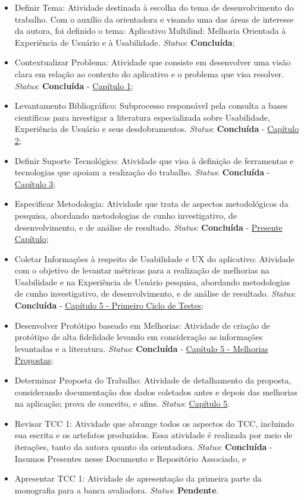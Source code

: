 \begin{itemize}
	\item Definir Tema: Atividade destinada à escolha do tema de desenvolvimento do trabalho. Com o auxílio da orientadora e visando uma das áreas de interesse da autora, foi definido o tema: Aplicativo Multilind: Melhoria Orientada à
	Experiência de Usuário e à Usabilidade. \textit{Status}: \textbf{Concluída};
	\item Contextualizar Problema: Atividade que consiste em desenvolver uma visão clara em relação ao contexto do aplicativo e o problema que visa resolver. \textit{Status}: \textbf{Concluída} - \hyperref[chap:Introducao]{Capítulo 1};
	\item Levantamento Bibliográfico: Subprocesso responsável pela consulta a bases científicas para investigar a literatura especializada sobre Usabilidade, Experiência de Usuário e seus desdobramentos. \textit{Status}: \textbf{Concluída} - \hyperref[chap:Referencial]{Capítulo 2};
	\item Definir Suporte Tecnológico: Atividade que visa à definição de ferramentas e tecnologias que apoiam a realização do trabalho. \textit{Status}: \textbf{Concluída} - \hyperref[chap:ReferencialTech]{Capítulo 3};
	\item Especificar Metodologia: Atividade que trata de aspectos metodológicos da  pesquisa, abordando metodologias de cunho investigativo, de desenvolvimento, e de análise de resultado. \textit{Status}: \textbf{Concluída} - \hyperref[chap:Metodologia]{Presente Capítulo};
	\item Coletar Informações à respeito de Usabilidade e UX do aplicativo: Atividade com o objetivo de levantar métricas para a realização de melhorias na Usabilidade e na Experiência de Usuário pesquisa, abordando metodologias de cunho investigativo, de desenvolvimento, e de análise de resultado. \textit{Status}: \textbf{Concluída} - \hyperref[sec:Primeiro Ciclo]{Capítulo 5 - Primeiro Ciclo de Testes};
	\item Desenvolver Protótipo baseado em Melhorias: Atividade de criação de protótipo de alta fidelidade levando em consideração as informações levantadas e a literatura. \textit{Status}: \textbf{Concluída} - \hyperref[sec:Melhorias Propostas]{Capítulo 5 - Melhorias Propostas};
	\item Determinar Proposta do Trabalho: Atividade de detalhamento da proposta, considerando documentação dos dados coletados antes e depois das melhorias na aplicação; prova de conceito, e afins. \textit{Status}: \hyperref[chap:Proposta]{Capítulo 5}.
	\item Revisar TCC 1: Atividade que abrange todos os aspectos do TCC, incluindo sua escrita e os artefatos produzidos. Essa atividade é realizada por meio de iterações, tanto da autora quanto da orientadora. \textit{Status}: \textbf{Concluída} -  Insumos Presentes nesse Documento e Repositório Associado, e
	\item Apresentar TCC 1: Atividade de apresentação da primeira parte da monografia para a banca avaliadora. \textit{Status}: \textbf{Pendente}.
\end{itemize}

